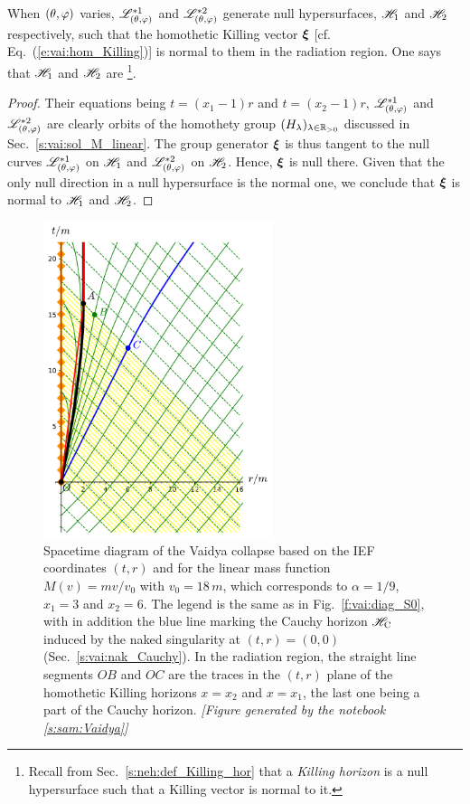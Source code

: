 \begin{greybox}
When $(\theta,\varphi)$ varies, $\mathscr{L}^{*1}_{(\theta,\varphi)}$ and $\mathscr{L}^{*2}_{(\theta,\varphi)}$
generate null hypersurfaces, $\mathscr{H}_1$ and $\mathscr{H}_2$ respectively,
such that the homothetic Killing vector $\bm{\xi}$
[cf. Eq.~(\ref{e:vai:hom_Killing})] is normal to them
in the radiation region. One says that $\mathscr{H}_1$ and $\mathscr{H}_2$
are
\footnote{Recall from Sec.~\ref{s:neh:def_Killing_hor} that
a \emph{Killing horizon} is a null hypersurface such that a Killing vector is normal to it.}.
\end{greybox}
\begin{proof}
Their equations being $t=(x_1 - 1)r$ and $t=(x_2 - 1)r$, $ \mathscr{L}^{*1}_{(\theta,\varphi)}$ and
$ \mathscr{L}^{*2}_{(\theta,\varphi)}$ are clearly orbits of the
homothety group $(H_\lambda)_{\lambda\in \mathbb{R}_{>0}}$ discussed in Sec.~\ref{s:vai:sol_M_linear}.
The group generator $\bm{\xi}$ is thus tangent to the null curves $\mathscr{L}^{*1}_{(\theta,\varphi)}$ on $\mathscr{H}_1$
and $\mathscr{L}^{*2}_{(\theta,\varphi)}$ on $\mathscr{H}_2$. Hence,
$\bm{\xi}$ is null there. Given that the
only null direction in a null hypersurface is the normal one, we conclude
that  $\bm{\xi}$ is normal to $\mathscr{H}_1$ and $\mathscr{H}_2$.
\end{proof}

\begin{figure}
\centerline{\includegraphics[width=0.6\textwidth]{vai_diag_naked_S0.pdf}}
\caption[]{\label{f:vai:diag_naked_S0} \footnotesize
Spacetime diagram of the Vaidya collapse based on the IEF coordinates $(t, r)$
and for the linear mass function $M(v)=m v/v_0$ with $v_0 = 18\, m$,
which corresponds to $\alpha = 1/9$, $x_1 = 3$
and $x_2 = 6$.
The legend is the same as in Fig.~\ref{f:vai:diag_S0}, with in addition
the blue line marking the Cauchy horizon $\mathscr{H}_{\rm C}$ induced by the naked singularity
at $(t,r) = (0,0)$ (Sec.~\ref{s:vai:nak_Cauchy}).
In the radiation region, the straight line segments
$OB$ and $OC$ are the traces in the $(t,r)$ plane of the homothetic Killing horizons $x=x_2$ and $x=x_1$, the last one being a
part of the Cauchy horizon.
\textsl{[Figure generated by the notebook \ref{s:sam:Vaidya}]}
}
\end{figure}

